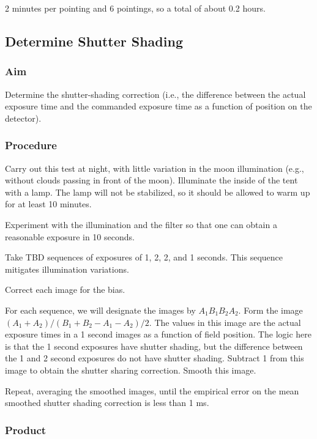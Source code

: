 \documentclass{article}
\begin{document}
2 minutes per pointing and 6 pointings, so a total of about 0.2 hours.


\subsection{Determine Shutter Shading}

\subsubsection{Aim}

Determine the shutter-shading correction (i.e., the difference between the actual exposure time and the commanded exposure time as a function of position on the detector).

\subsubsection{Procedure}

Carry out this test at night, with little variation in the moon illumination (e.g., without clouds passing in front of the moon). Illuminate the inside of the tent with a lamp. The lamp will not be stabilized, so it should be allowed to warm up for at least 10 minutes.

Experiment with the illumination and the filter so that one can obtain a reasonable exposure in 10 seconds.

Take TBD sequences of exposures of 1, 2, 2, and 1 seconds. This sequence mitigates illumination variations.

Correct each image for the bias.

For each sequence, we will designate the images by $A_1B_1B_2A_2$.
Form the image $(A_1+A_2)/(B_1+B_2-A_1-A_2)/2$. The values in this image are the actual exposure times in a 1 second images as a function of field position. The logic here is that the 1 second exposures have shutter shading, but the difference between the 1 and 2 second exposures do not have shutter shading. Subtract 1 from this image to obtain the shutter sharing correction. Smooth this image.

Repeat, averaging the smoothed images, until the empirical error on the mean smoothed shutter shading correction is less than 1 ms.

\subsubsection{Product}
\end{document}
